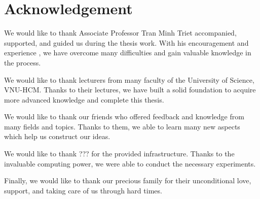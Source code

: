 \chapter{Acknowledgement}


We would like to thank Associate Professor Tran Minh Triet accompanied, supported, and guided us during the thesis work. With his encouragement and experience , we  have overcome many difficulties and gain valuable knowledge in the process.

We would like to thank lecturers from many faculty of the University of Science, VNU-HCM. Thanks to their lectures, we have built a solid foundation to acquire more advanced knowledge and complete this thesis.

We would like to thank our friends who offered feedback and knowledge from many fields and topics. Thanks to them, we able to learn many new aspects which help us construct our ideas.


We would like to thank ??? for the provided infrastructure. Thanks to the invaluable computing power, we were able to conduct the necessary experiments.

Finally, we would like to thank our precious family for their unconditional love, support, and taking care of us through hard times. 